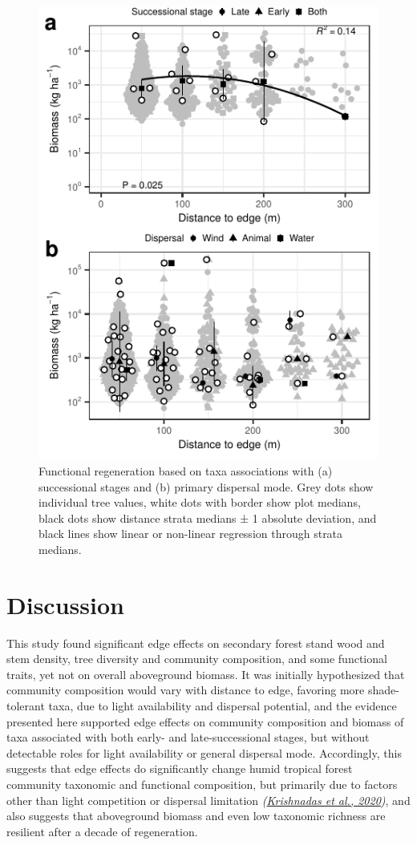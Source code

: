 \documentclass[
  12pt,
]{article}
\begin{document}
\begin{figure}
\centering
\includegraphics{merge_files/figure-latex/traits-1.pdf}
\caption{\label{fig:traits} Functional regeneration based on taxa associations with (a) successional stages and (b) primary dispersal mode. Grey dots show individual tree values, white dots with border show plot medians, black dots show distance strata medians ± 1 absolute deviation, and black lines show linear or non-linear regression through strata medians.}
\end{figure}

\hypertarget{discussion}{%
\section{Discussion}\label{discussion}}

This study found significant edge effects on secondary forest stand wood and stem density, tree diversity and community composition, and some functional traits, yet not on overall aboveground biomass.
It was initially hypothesized that community composition would vary with distance to edge, favoring more shade-tolerant taxa, due to light availability and dispersal potential,
and the evidence presented here supported edge effects on community composition and biomass of taxa associated with both early- and late-successional stages, but without detectable roles for light availability or general dispersal mode.
Accordingly, this suggests that edge effects do significantly change humid tropical forest community taxonomic and functional composition, but primarily due to factors other than light competition or dispersal limitation \emph{(\protect\hyperlink{ref-krishnadas20}{Krishnadas et al., 2020})}, and also suggests that aboveground biomass and even low taxonomic richness are resilient after a decade of regeneration.
\end{document}
